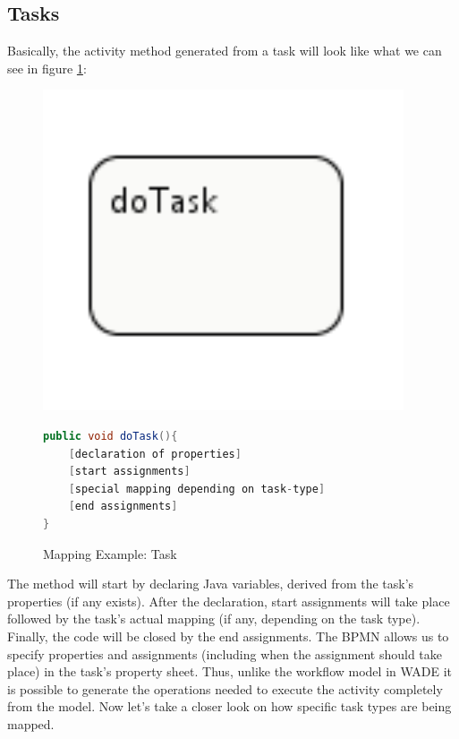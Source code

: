 \subsection{Tasks}
Basically, the activity method generated from a task will look like what we can see in figure \ref{fig:mapping_task}:

\begin{figure}[h]
\begin{minipage}[c]{0.3\textwidth}
\includegraphics[width=0.95\textwidth]{images/mapping/task.png}
\end{minipage}
\begin{minipage}[c]{0.7\textwidth}
\begin{lstlisting}[language=Java]
public void doTask(){
	[declaration of properties]
	[start assignments]
	[special mapping depending on task-type]
	[end assignments]
}
\end{lstlisting}
\end{minipage}
\caption{Mapping Example: Task}%
\label{fig:mapping_task}%
\end{figure}
The method will start by declaring Java variables, derived from the task's properties (if any exists). After the declaration, start assignments will take place followed by the task's actual mapping (if any, depending on the task type). Finally, the code will be closed by the end assignments. The BPMN allows us to specify properties and assignments (including when the assignment should take place) in the task's property sheet. Thus, unlike the workflow model in WADE it is possible to generate the operations needed to execute the activity completely from the model. Now let's take a closer look on how specific task types are being mapped.\\

